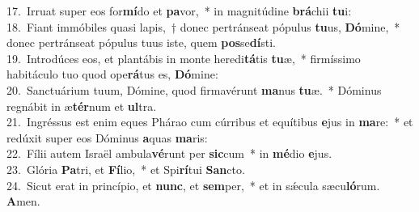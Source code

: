 {17.~}Irruat super eos for\textbf{mí}do et \textbf{pa}vor,~* in magnitúdine \textbf{brá}chii \textbf{tu}i:\\
{18.~}Fiant immóbiles quasi lapis,~† donec pertránseat pópulus \textbf{tu}us, \textbf{Dó}mine,~* donec pertránseat pópulus tuus iste, quem \textbf{pos}se\textbf{dí}sti.\\
{19.~}Introdúces eos, et plantábis in monte heredi\textbf{tá}tis \textbf{tu}æ,~* firmíssimo habitáculo tuo quod ope\textbf{rá}tus es, \textbf{Dó}mine:\\
{20.~}Sanctuárium tuum, Dómine, quod firmavérunt \textbf{ma}nus \textbf{tu}æ.~* Dóminus regnábit in æ\textbf{tér}num et \textbf{ul}tra.\\
{21.~}Ingréssus est enim eques Phárao cum cúrribus et equítibus \textbf{e}jus in \textbf{ma}re:~* et redúxit super eos Dóminus \textbf{a}quas \textbf{ma}ris:\\
{22.~}Fílii autem Israël ambula\textbf{vé}runt per \textbf{sic}cum~* in \textbf{mé}dio \textbf{e}jus.\\
{23.~}Glória \textbf{Pa}tri, et \textbf{Fí}lio,~* et Spi\textbf{rí}tui \textbf{San}cto.\\
{24.~}Sicut erat in princípio, et \textbf{nunc}, et \textbf{sem}per,~* et in sǽcula sæcu\textbf{ló}rum. \textbf{A}men.\\
